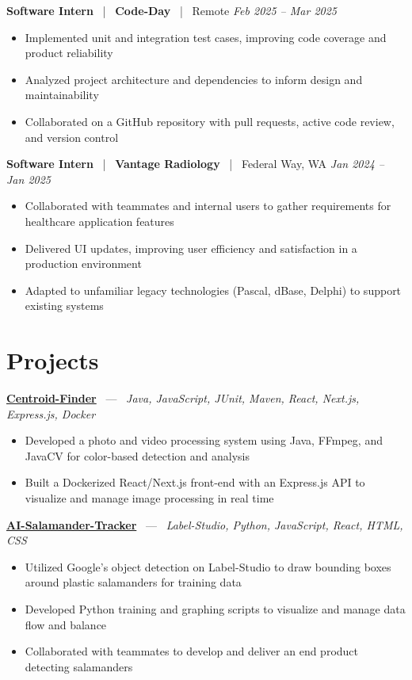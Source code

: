 \documentclass[10pt, letterpaper]{article}
\newcommand{\jobhead}[4]{%
  \vspace{5pt}%
  {\bfseries\color{dark}#1}%
  ~{\color{light}|}~%
  {\bfseries\color{navy}#2}%
  ~{\color{light}|}~%
  {\color{light}#3}%
  \hfill{\color{light}\small\textit{#4}}\\[-2pt]%
}
\newcommand{\projhead}[3]{%
  \vspace{5pt}%
  {\bfseries\color{dark}\href{#2}{#1}}%
  ~{\color{light}---}~%
  {\color{light}\small\textit{#3}}\\[-2pt]%
}
\begin{document}
\jobhead{Software Intern}{Code-Day}{Remote}{Feb 2025 – Mar 2025}
\begin{itemize}
  \item Implemented unit and integration test cases, improving code coverage and product reliability
  \item Analyzed project architecture and dependencies to inform design and maintainability
  \item Collaborated on a GitHub repository with pull requests, active code review, and version control
\end{itemize}

\jobhead{Software Intern}{Vantage Radiology}{Federal Way, WA}{Jan 2024 – Jan 2025}
\begin{itemize}
  \item Collaborated with teammates and internal users to gather requirements for healthcare application features
  \item Delivered UI updates, improving user efficiency and satisfaction in a production environment
  \item Adapted to unfamiliar legacy technologies (Pascal, dBase, Delphi) to support existing systems
\end{itemize}

\section{Projects}

\projhead{Centroid-Finder}{https://github.com/xavierb117/centroid-finder}{Java, JavaScript, JUnit, Maven, React, Next.js, Express.js, Docker}
\begin{itemize}
  \item Developed a photo and video processing system using Java, FFmpeg, and JavaCV for color-based detection and analysis
  \item Built a Dockerized React/Next.js front-end with an Express.js API to visualize and manage image processing in real time
\end{itemize}

\projhead{AI-Salamander-Tracker}{https://github.com/xavierb117/Salamander-Tracker-YOLO}{Label-Studio, Python, JavaScript, React, HTML, CSS}
\begin{itemize}
  \item Utilized Google's object detection on Label-Studio to draw bounding boxes around plastic salamanders for training data
  \item Developed Python training and graphing scripts to visualize and manage data flow and balance
  \item Collaborated with teammates to develop and deliver an end product detecting salamanders
\end{itemize}
\end{document}
